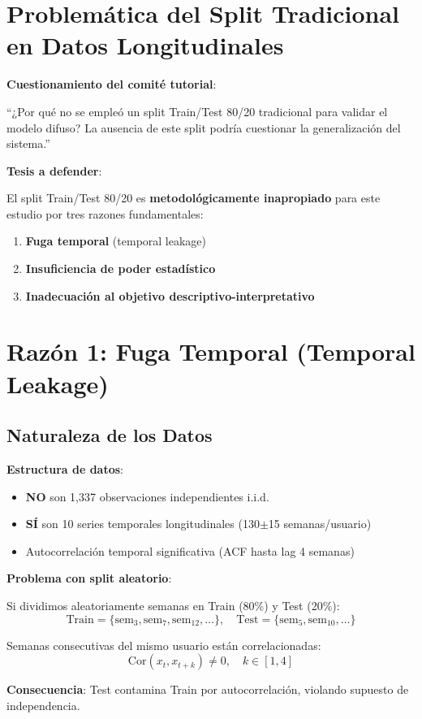 \documentclass[12pt,letterpaper,twoside]{report}
\begin{document}
\section{Problemática del Split Tradicional en Datos Longitudinales}

\begin{hipotesisbox}
\textbf{Cuestionamiento del comité tutorial}:

``¿Por qué no se empleó un split Train/Test 80/20 tradicional para validar el modelo difuso? La ausencia de este split podría cuestionar la generalización del sistema.''

\textbf{Tesis a defender}:

El split Train/Test 80/20 es \textbf{metodológicamente inapropiado} para este estudio por tres razones fundamentales:
\begin{enumerate}[noitemsep]
    \item \textbf{Fuga temporal} (temporal leakage)
    \item \textbf{Insuficiencia de poder estadístico}
    \item \textbf{Inadecuación al objetivo descriptivo-interpretativo}
\end{enumerate}
\end{hipotesisbox}

\section{Razón 1: Fuga Temporal (Temporal Leakage)}

\subsection{Naturaleza de los Datos}

\begin{reglabox}
\textbf{Estructura de datos}:

\begin{itemize}[noitemsep]
    \item \textbf{NO} son 1,337 observaciones independientes i.i.d.
    \item \textbf{SÍ} son 10 series temporales longitudinales (130$\pm$15 semanas/usuario)
    \item Autocorrelación temporal significativa (ACF hasta lag 4 semanas)
\end{itemize}

\textbf{Problema con split aleatorio}:

Si dividimos aleatoriamente semanas en Train (80\%) y Test (20\%):
\begin{equation}
\text{Train} = \{\text{sem}_3, \text{sem}_7, \text{sem}_{12}, \ldots\}, \quad \text{Test} = \{\text{sem}_5, \text{sem}_{10}, \ldots\}
\end{equation}

Semanas consecutivas del mismo usuario están correlacionadas:
\begin{equation}
\text{Cor}(x_t, x_{t+k}) \neq 0, \quad k \in [1, 4]
\end{equation}

\textbf{Consecuencia}: Test contamina Train por autocorrelación, violando supuesto de independencia.
\end{reglabox}
\end{document}
